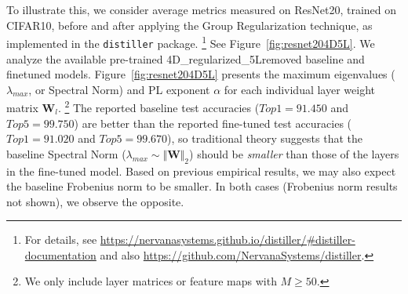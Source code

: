 To illustrate this, we consider average metrics measured on ResNet20, trained on CIFAR10, before and after applying the Group Regularization technique, 
as implemented in the \texttt{distiller} package.%
\footnote{For details, see \url{https://nervanasystems.github.io/distiller/\#distiller-documentation} and also \url{https://github.com/NervanaSystems/distiller}.}
See Figure~\ref{fig:resnet204D5L}.
%
We analyze the available pre-trained 4D\_regularized\_5Lremoved baseline and finetuned models.  %
Figure~\ref{fig:resnet204D5L} presents the maximum eigenvalues ($\lambda_{max}$, or Spectral Norm) and PL exponent $\alpha$ for each individual layer weight matrix $\mathbf{W}_{l}$.%
\footnote{We only include layer matrices or feature maps with  $M\ge50$.}
The reported baseline  test accuracies ($Top1=91.450$ and $Top5=99.750$)
are better than the reported fine-tuned test accuracies ($Top1=91.020$ and $Top5=99.670$), so traditional theory suggests that the baseline Spectral Norm
($\lambda_{max}\sim\Vert\mathbf{W}\Vert_{2}$) should be \emph{smaller} than those of the layers in the fine-tuned model.
Based on previous empirical results, we may also expect the baseline Frobenius norm to be smaller.  %
In both cases (Frobenius norm results not shown), we observe the opposite.

